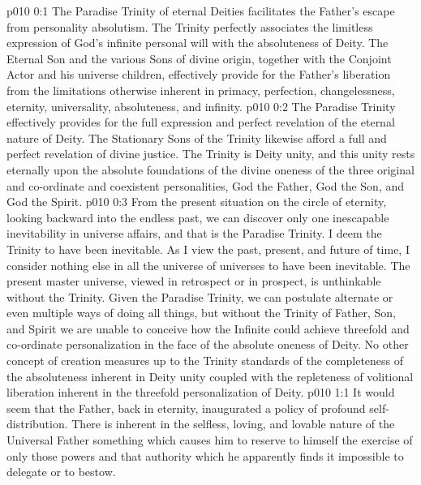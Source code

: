 \author{Universal Censor}
\vs p010 0:1 The Paradise Trinity of eternal Deities facilitates the Father’s escape from personality absolutism. The Trinity perfectly associates the limitless expression of God’s infinite personal will with the absoluteness of Deity. The Eternal Son and the various Sons of divine origin, together with the Conjoint Actor and his universe children, effectively provide for the Father’s liberation from the limitations otherwise inherent in primacy, perfection, changelessness, eternity, universality, absoluteness, and infinity.
\vs p010 0:2 The Paradise Trinity effectively provides for the full expression and perfect revelation of the eternal nature of Deity. The Stationary Sons of the Trinity likewise afford a full and perfect revelation of divine justice. The Trinity is Deity unity, and this unity rests eternally upon the absolute foundations of the divine oneness of the three original and co\hyp{}ordinate and coexistent personalities, God the Father, God the Son, and God the Spirit.
\vs p010 0:3 \pc From the present situation on the circle of eternity, looking backward into the endless past, we can discover only one inescapable inevitability in universe affairs, and that is the Paradise Trinity. I deem the Trinity to have been inevitable. As I view the past, present, and future of time, I consider nothing else in all the universe of universes to have been inevitable. The present master universe, viewed in retrospect or in prospect, is unthinkable without the Trinity. Given the Paradise Trinity, we can postulate alternate or even multiple ways of doing all things, but without the Trinity of Father, Son, and Spirit we are unable to conceive how the Infinite could achieve threefold and co\hyp{}ordinate personalization in the face of the absolute oneness of Deity. No other concept of creation measures up to the Trinity standards of the completeness of the absoluteness inherent in Deity unity coupled with the repleteness of volitional liberation inherent in the threefold personalization of Deity.
\vs p010 1:1 It would seem that the Father, back in eternity, inaugurated a policy of profound self\hyp{}distribution. There is inherent in the selfless, loving, and lovable nature of the Universal Father something which causes him to reserve to himself the exercise of only those powers and that authority which he apparently finds it impossible to delegate or to bestow.
